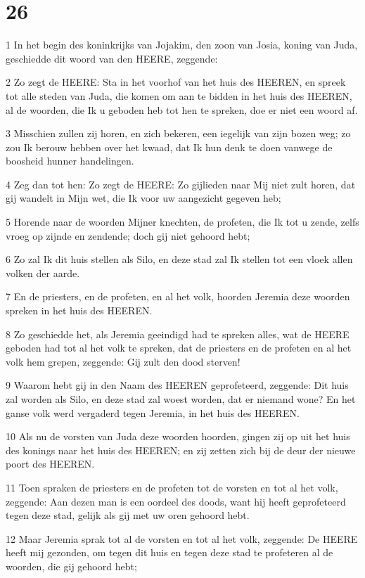 \chapter{26}

\par 1 In het begin des koninkrijks van Jojakim, den zoon van Josia, koning van Juda, geschiedde dit woord van den HEERE, zeggende:
\par 2 Zo zegt de HEERE: Sta in het voorhof van het huis des HEEREN, en spreek tot alle steden van Juda, die komen om aan te bidden in het huis des HEEREN, al de woorden, die Ik u geboden heb tot hen te spreken, doe er niet een woord af.
\par 3 Misschien zullen zij horen, en zich bekeren, een iegelijk van zijn bozen weg; zo zou Ik berouw hebben over het kwaad, dat Ik hun denk te doen vanwege de boosheid hunner handelingen.
\par 4 Zeg dan tot hen: Zo zegt de HEERE: Zo gijlieden naar Mij niet zult horen, dat gij wandelt in Mijn wet, die Ik voor uw aangezicht gegeven heb;
\par 5 Horende naar de woorden Mijner knechten, de profeten, die Ik tot u zende, zelfs vroeg op zijnde en zendende; doch gij niet gehoord hebt;
\par 6 Zo zal Ik dit huis stellen als Silo, en deze stad zal Ik stellen tot een vloek allen volken der aarde.
\par 7 En de priesters, en de profeten, en al het volk, hoorden Jeremia deze woorden spreken in het huis des HEEREN.
\par 8 Zo geschiedde het, als Jeremia geeindigd had te spreken alles, wat de HEERE geboden had tot al het volk te spreken, dat de priesters en de profeten en al het volk hem grepen, zeggende: Gij zult den dood sterven!
\par 9 Waarom hebt gij in den Naam des HEEREN geprofeteerd, zeggende: Dit huis zal worden als Silo, en deze stad zal woest worden, dat er niemand wone? En het ganse volk werd vergaderd tegen Jeremia, in het huis des HEEREN.
\par 10 Als nu de vorsten van Juda deze woorden hoorden, gingen zij op uit het huis des konings naar het huis des HEEREN; en zij zetten zich bij de deur der nieuwe poort des HEEREN.
\par 11 Toen spraken de priesters en de profeten tot de vorsten en tot al het volk, zeggende: Aan dezen man is een oordeel des doods, want hij heeft geprofeteerd tegen deze stad, gelijk als gij met uw oren gehoord hebt.
\par 12 Maar Jeremia sprak tot al de vorsten en tot al het volk, zeggende: De HEERE heeft mij gezonden, om tegen dit huis en tegen deze stad te profeteren al de woorden, die gij gehoord hebt;
